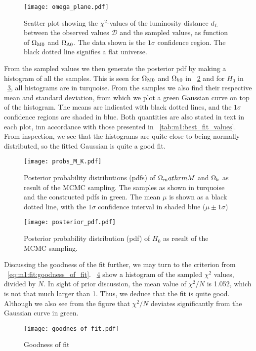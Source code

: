     \begin{figure}
        \texttt{[image: omega\_plane.pdf]}
        \caption{Scatter plot showing the $\chi^2$-values of the luminosity distance $d_L$ between the observed values $\mathcal{D}$ and the sampled values, as function of $\Omega_\mathrm{M0}$ and $\Omega_{\Lambda0}$. The data shown is the $1\sigma$ confidence region. The black dotted line signifies a flat universe. }
        \label{fig:m1:omega_planes}
    \end{figure}
    
    From the sampled values we then generate the posterior pdf by making a histogram of all the samples. This is seen for $\Omega_\mathrm{M0}$ and $\Omega_{k0}$ in ~\cref{fig:m1:posterior_pdf_omega_m_k} and for $H_0$ in ~\cref{fig:m1:posterior_pdf_H0}, all histograms are in turquoise. From the samples we also find their respective mean and standard deviation, from which we plot a green Gaussian curve on top of the histogram. The means are indicated with black dotted lines, and the $1\sigma$ confidence regions are shaded in blue. Both quantities are also stated in text in each plot, inn accordance with those presented in ~\cref{tab:m1:best_fit_values}. From inspection, we see that the histograms are quite close to being normally distributed, so the fitted Gaussian is quite a good fit. 
    
    \begin{figure}
        \texttt{[image: probs\_M\_K.pdf]}
        \caption{Posterior probability distributions (pdfs) of $\Omega_mathrm{M}$ and $\Omega_\mathrm{k}$ as result of the MCMC sampling. The samples as shown in turquoise and the constructed pdfs in green. The mean $\mu$ is shown as a black dotted line, with the $1\sigma$ confidence interval in shaded blue ($\mu\pm 1\sigma$)}
        \label{fig:m1:posterior_pdf_omega_m_k}
    \end{figure}
    
    \begin{figure}
        \texttt{[image: posterior\_pdf.pdf]}
        \caption{Posterior probability distribution (pdf) of $H_0$ as result of the MCMC sampling.}
        \label{fig:m1:posterior_pdf_H0}
    \end{figure}

    Discussing the goodness of the fit further, we may turn to the criterion from ~\cref{eq:m1:fit:goodness_of_fit}. ~\cref{fig:m1:goodness_of_fit} show a histogram of the sampled $\chi^2$ values, divided by $N$. In sight of prior discussion, the mean value of $\chi^2/N$ is 1.052, which is not that much larger than 1. Thus, we deduce that the fit is quite good. Although we also see from the figure that $\chi^2/N$ deviates significantly from the Gaussian curve in green.  
    
    \begin{figure}
        \texttt{[image: goodnes\_of\_fit.pdf]}
        \caption{Goodness of fit}
        \label{fig:m1:goodness_of_fit}
    \end{figure}
    